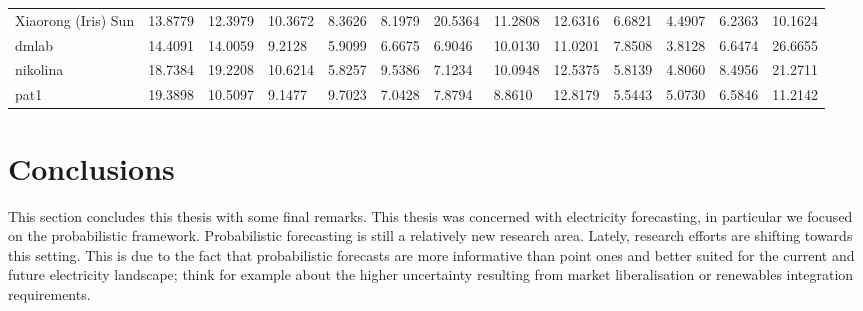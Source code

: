 \begin{table}[!ht]
\begin{adjustbox}{width=\textwidth}
\begin{tabular}{lllllllllllll}
  Xiaorong (Iris) Sun        & 13.8779                         & 12.3979                         & 10.3672                         & 8.3626 & 8.1979                         & 20.5364 & 11.2808                         & 12.6316 & 6.6821  & 4.4907                         & 6.2363                         & 10.1624                         \\
  dmlab                      & 14.4091                         & 14.0059                         & 9.2128                          & 5.9099                         & 6.6675                         & 6.9046  & 10.0130                         & 11.0201 & 7.8508  & 3.8128                         & 6.6474                         & 26.6655                         \\
  nikolina                   & 18.7384 & 19.2208                         & 10.6214                         & 5.8257                         & 9.5386                         & 7.1234  & 10.0948                         & 12.5375 & 5.8139  & 4.8060                         & 8.4956                         & 21.2711 \\
  pat1                       & 19.3898                         & 10.5097                         & 9.1477                          & 9.7023                         & 7.0428                         & 7.8794  & 8.8610                          & 12.8179 & 5.5443  & 5.0730                         & 6.5846                         & 11.2142                       
  \end{tabular}
  \end{adjustbox}
  \end{table}







\section{Conclusions}
This section concludes this thesis with some final remarks.
This thesis was concerned with electricity forecasting, in particular we focused on the probabilistic framework.
Probabilistic forecasting is still a relatively new research area. Lately, research efforts are shifting towards this setting. This is due to the fact that probabilistic forecasts are more informative than point ones and better suited for the current and future electricity landscape; think for example about the higher uncertainty resulting from market liberalisation or renewables integration requirements.

